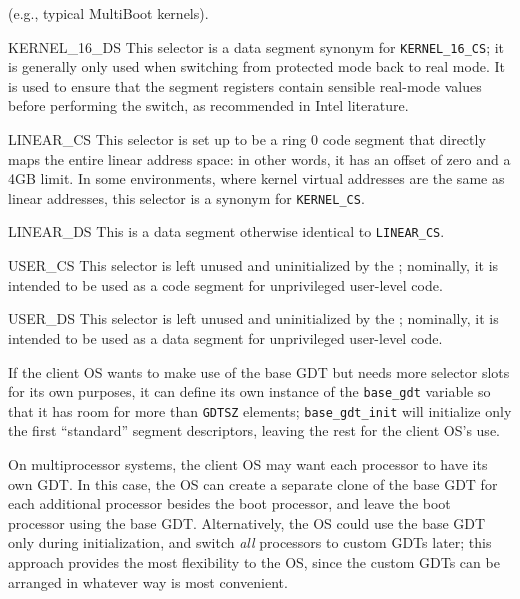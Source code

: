 \begin{apidesc}
\begin{icsymlist}
		(e.g., typical MultiBoot kernels).
	\item[KERNEL_16_DS]
		This selector is a data segment synonym for {\tt KERNEL_16_CS};
		it is generally only used
		when switching from protected mode back to real mode.
		It is used to ensure that the segment registers
		contain sensible real-mode values before performing the switch,
		as recommended in Intel literature.
	\item[LINEAR_CS]
		This selector is set up to be a ring 0 code segment
		that directly maps the entire linear address space:
		in other words, it has an offset of zero and a 4GB limit.
		In some environments, where kernel virtual addresses
		are the same as linear addresses,
		this selector is a synonym for {\tt KERNEL_CS}.
	\item[LINEAR_DS]
		This is a data segment otherwise identical to {\tt LINEAR_CS}.
	\item[USER_CS]
		This selector is left unused and uninitialized
		by the \oskit{};
		nominally, it is intended to be used
		as a code segment for unprivileged user-level code.
	\item[USER_DS]
		This selector is left unused and uninitialized
		by the \oskit{};
		nominally, it is intended to be used
		as a data segment for unprivileged user-level code.
	\end{icsymlist}

	If the client OS wants to make use of the base GDT
	but needs more selector slots for its own purposes,
	it can define its own instance of the {\tt base_gdt} variable
	so that it has room for more than {\tt GDTSZ} elements;
	{\tt base_gdt_init} will initialize
	only the first ``standard'' segment descriptors,
	leaving the rest for the client OS's use.

	On multiprocessor systems,
	the client OS may want each processor to have its own GDT\@.
	In this case, the OS can create a separate clone of the base GDT
	for each additional processor besides the boot processor,
	and leave the boot processor using the base GDT\@.
	Alternatively, the OS could use the base GDT only during initialization,
	and switch \emph{all} processors to custom GDTs later;
	this approach provides the most flexibility to the OS,
	since the custom GDTs can be arranged
	in whatever way is most convenient.
\end{apidesc}

